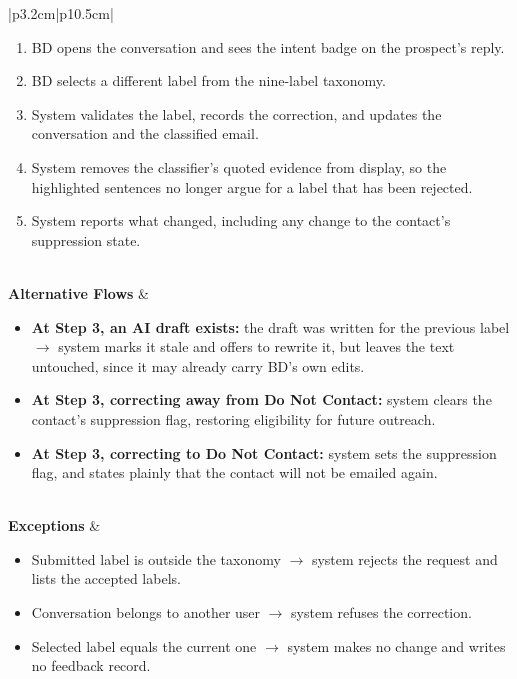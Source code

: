 \documentclass[a4paper]{article}
\begin{document}
\begin{table}[H]
\begin{tabular}{|p{3.2cm}|p{10.5cm}|}
\begin{minipage}[t]{\linewidth}
\begin{enumerate}[nosep,leftmargin=*]
  \item BD opens the conversation and sees the intent badge on the
  prospect's reply.
  \item BD selects a different label from the nine-label taxonomy.
  \item System validates the label, records the correction, and
  updates the conversation and the classified email.
  \item System removes the classifier's quoted evidence from display,
  so the highlighted sentences no longer argue for a label that has
  been rejected.
  \item System reports what changed, including any change to the
  contact's suppression state.
\end{enumerate}
\end{minipage} \\
\hline
\textbf{Alternative Flows} &
\begin{minipage}[t]{\linewidth}
\begin{itemize}[nosep,leftmargin=*]
  \item \textbf{At Step 3, an AI draft exists:} the draft was written
  for the previous label $\rightarrow$ system marks it stale and
  offers to rewrite it, but leaves the text untouched, since it may
  already carry BD's own edits.
  \item \textbf{At Step 3, correcting away from Do Not Contact:}
  system clears the contact's suppression flag, restoring
  eligibility for future outreach.
  \item \textbf{At Step 3, correcting to Do Not Contact:} system
  sets the suppression flag, and states plainly that the contact
  will not be emailed again.
\end{itemize}
\end{minipage} \\
\hline
\textbf{Exceptions} &
\begin{minipage}[t]{\linewidth}
\begin{itemize}[nosep,leftmargin=*]
  \item Submitted label is outside the taxonomy $\rightarrow$ system
  rejects the request and lists the accepted labels.
  \item Conversation belongs to another user $\rightarrow$ system
  refuses the correction.
  \item Selected label equals the current one $\rightarrow$ system
  makes no change and writes no feedback record.
\end{itemize}
\end{minipage} \\
\hline
\end{tabular}
\end{table}
\end{document}
